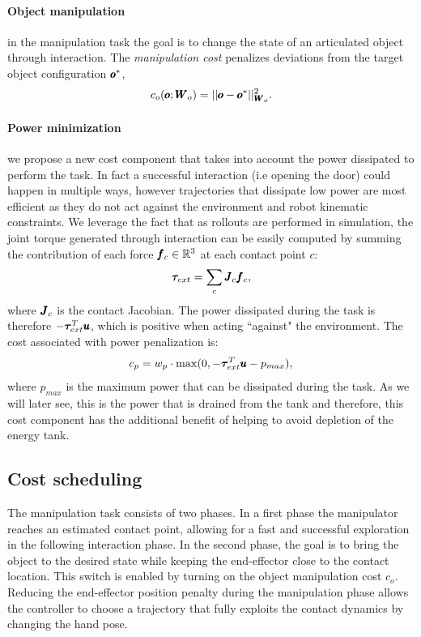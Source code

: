  \paragraph{Object manipulation} in the manipulation task the goal is to change the state of an articulated object through interaction. The \textit{manipulation cost} penalizes deviations from the target object configuration $\pmb{o}^{*}$,
\begin{equation}
    c_o(\pmb{o}; \pmb{W}_{o}) = || \pmb{o} - \pmb{o}^{*}||^2_{\pmb{W}_{o}}.
\end{equation}
\paragraph{Power minimization} we propose a new cost component that takes into account the power dissipated to perform the task. In fact a successful interaction (i.e opening the door) could happen in multiple ways, however trajectories that dissipate low power are most efficient as they do not act against the environment and robot kinematic constraints. We leverage the fact that as rollouts are performed in simulation, the joint torque generated through interaction can be easily computed by summing the contribution of each force $\pmb{f}_c \in \mathbb{R}^{3}$ at each contact point $c$:
\begin{equation}
\boldsymbol{\tau}_{ext} = \sum\limits_{c} \pmb{J}_c \pmb{f}_c,    
\end{equation}
where $\pmb{J}_c$ is the contact Jacobian. The power dissipated during the task is therefore $-\boldsymbol{\tau}_{ext}^T\pmb{u}$, which is positive when acting ``against" the environment. The cost associated with power penalization is:
\begin{equation}
   c_p = w_{p} \cdot \max(0, - \boldsymbol{\tau}_{ext}^T\pmb{u} - p_{max}),      
 \end{equation}
where $p_{max}$ is the maximum power that can be dissipated during the task.
As we will later see, this is the power that is drained from the tank and therefore, this cost component has the additional benefit of helping to avoid depletion of the energy tank.

\subsection{Cost scheduling}
The manipulation task consists of two phases. In a first phase the manipulator reaches an estimated contact point, allowing for a fast and successful exploration in the following interaction phase. In the second phase, the goal is to bring the object to the desired state while keeping the end-effector close to the contact location. This switch is enabled by turning on the object manipulation cost $c_o$. Reducing the end-effector position penalty during the manipulation phase allows the controller to choose a trajectory that fully exploits the contact dynamics by changing the hand pose. 


